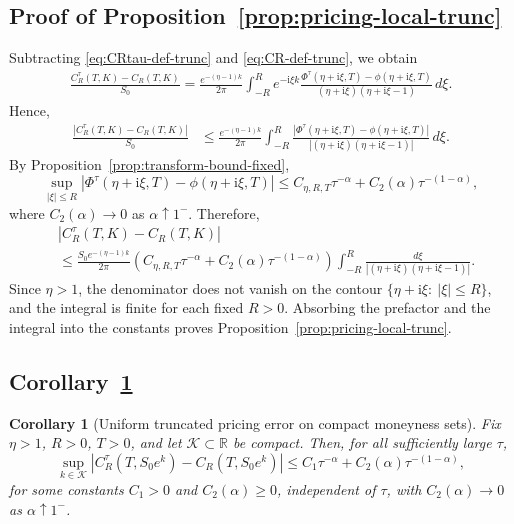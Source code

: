 \documentclass[letterpaper]{article}
\numberwithin{equation}{section}
\newtheorem{corollary}[theorem]{Corollary}
\theoremstyle{definition}
\theoremstyle{remark}
\newcommand{\R}{\mathbb{R}}
\newcommand{\ii}{\mathrm{i}}
\begin{document}
\subsection{Proof of Proposition~\ref{prop:pricing-local-trunc}}\label{app:proof-pricing-local-trunc}
Subtracting \eqref{eq:CRtau-def-trunc} and \eqref{eq:CR-def-trunc}, we obtain
\begin{align*}
  \frac{C_R^\tau(T,K)-C_R(T,K)}{S_0}
  =
  \frac{e^{-(\eta-1)k}}{2\pi}
  \int_{-R}^{R}
    e^{-\ii \xi k}
    \frac{
      \Phi^\tau(\eta+\ii \xi,T)-\phi(\eta+\ii \xi,T)
    }
    {(\eta+\ii \xi)(\eta+\ii \xi-1)}
  \,d\xi.
\end{align*}
Hence,
\begin{align*}
  \frac{|C_R^\tau(T,K)-C_R(T,K)|}{S_0}
  &\le
  \frac{e^{-(\eta-1)k}}{2\pi}
  \int_{-R}^{R}
    \frac{
      |\Phi^\tau(\eta+\ii \xi,T)-\phi(\eta+\ii \xi,T)|
    }
    {|(\eta+\ii \xi)(\eta+\ii \xi-1)|}
  \,d\xi.
\end{align*}
By Proposition~\ref{prop:transform-bound-fixed},
\[
  \sup_{|\xi|\le R}
  \left|
    \Phi^\tau(\eta+\ii \xi,T)-\phi(\eta+\ii \xi,T)
  \right|
  \le
  C_{\eta,R,T}\tau^{-\alpha}+C_2(\alpha)\tau^{-(1-\alpha)},
\]
where
$C_2(\alpha)\to0$
as $\alpha\uparrow1^-$.
Therefore,
\begin{align*}
  &|C_R^\tau(T,K)-C_R(T,K)|\\
  &\le
  \frac{S_0 e^{-(\eta-1)k}}{2\pi}
  \left(
    C_{\eta,R,T}\tau^{-\alpha}+C_2(\alpha)\tau^{-(1-\alpha)}
  \right)
  \int_{-R}^{R}\frac{d\xi}{|(\eta+\ii \xi)(\eta+\ii \xi-1)|}.
\end{align*}
Since $\eta>1$, the denominator does not vanish on the contour
$\{\eta+\ii\xi:\ |\xi|\le R\}$, and the integral is finite for each fixed
$R>0$. Absorbing the prefactor and the integral into the constants proves
Proposition~\ref{prop:pricing-local-trunc}. 


\subsection{Corollary~\ref{cor:pricing-local-trunc-uniform}}\label{app:proof-pricing-local-trunc-uniform}

\begin{corollary}[Uniform truncated pricing error on compact moneyness sets]
\label{cor:pricing-local-trunc-uniform}
Fix $\eta>1$, $R>0$, $T>0$, and let $\mathcal K\subset\R$ be compact. Then,
for all sufficiently large $\tau$,
\begin{equation}\label{eq:pricing-local-trunc-uniform}
  \sup_{k\in\mathcal K}
  \left|C_R^\tau(T,S_0e^k)-C_R(T,S_0e^k)\right|
  \le
  C_1\tau^{-\alpha}+C_2(\alpha)\tau^{-(1-\alpha)},
\end{equation}
for some constants $C_1>0$ and $C_2(\alpha)\ge0$, independent of $\tau$, with
$C_2(\alpha)\to0$ as $\alpha\uparrow1^-$.
\end{corollary}
\end{document}
